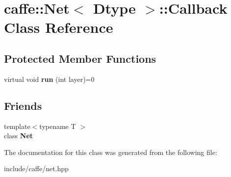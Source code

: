 \hypertarget{classcaffe_1_1Net_1_1Callback}{}\section{caffe\+:\+:Net$<$ Dtype $>$\+:\+:Callback Class Reference}
\label{classcaffe_1_1Net_1_1Callback}
\subsection*{Protected Member Functions}
\begin{DoxyCompactItemize}
\item 
virtual void {\bfseries run} (int layer)=0\hypertarget{classcaffe_1_1Net_1_1Callback_af2a143020f1b44b6da7c95333a364305}{}\label{classcaffe_1_1Net_1_1Callback_af2a143020f1b44b6da7c95333a364305}

\end{DoxyCompactItemize}
\subsection*{Friends}
\begin{DoxyCompactItemize}
\item 
{\footnotesize template$<$typename T $>$ }\\class {\bfseries Net}\hypertarget{classcaffe_1_1Net_1_1Callback_a594f84a944ccdd63ca62bfd4f8623836}{}\label{classcaffe_1_1Net_1_1Callback_a594f84a944ccdd63ca62bfd4f8623836}

\end{DoxyCompactItemize}


The documentation for this class was generated from the following file\+:\begin{DoxyCompactItemize}
\item 
include/caffe/net.\+hpp\end{DoxyCompactItemize}
